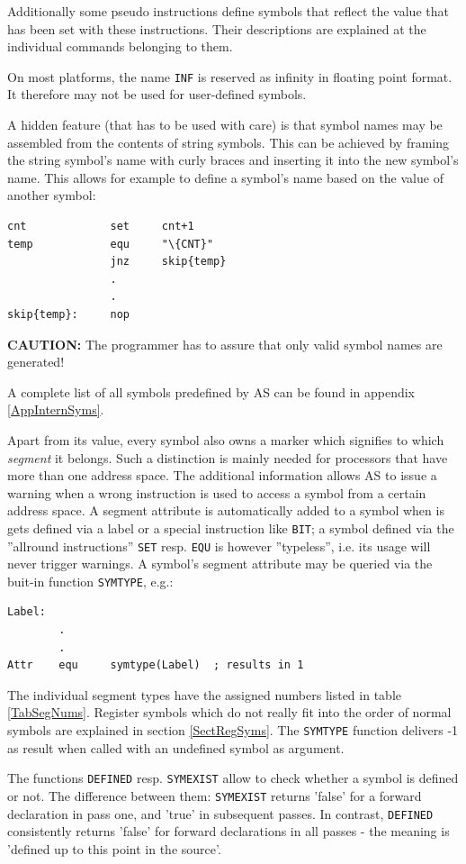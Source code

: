 \documentclass[12pt,twoside]{report}
\newcommand{\bb}[1]{{\bf #1}}
\newcommand{\tty}[1]{{\tt #1}}
\newcommand{\asname}{{AS}}
\begin{document}
Additionally some pseudo instructions define symbols that reflect the
value that has been set  with these instructions.  Their descriptions
are explained at the individual commands belonging to them.

On most platforms, the name {\tt INF} is reserved as infinity in
floating point format.  It therefore may not be used for user-defined
symbols.

A hidden feature (that has to be used with care) is that symbol names
may be assembled from the contents of string symbols.  This can be
achieved by framing the string symbol's name with curly braces and
inserting it into the new symbol's name.  This allows for example to
define a symbol's name based on the value of another symbol:
\begin{verbatim}
cnt             set     cnt+1
temp            equ     "\{CNT}"
                jnz     skip{temp}
                .
                .
skip{temp}:     nop
\end{verbatim}
\bb{CAUTION:} The programmer has to assure that only valid symbol names
are generated!

A complete list of all symbols predefined by \asname{} can be found in
appendix \ref{AppInternSyms}.

Apart from its value, every symbol also owns a marker which signifies to
which {\em segment} it belongs.  Such a distinction is mainly needed for
processors that have more than one address space.  The additional
information allows \asname{} to issue a warning when a wrong instruction is used
to access a symbol from a certain address space.  A segment attribute is
automatically added to a symbol when is gets defined via a label or a
special instruction like \tty{BIT}; a symbol defined via the ''allround
instructions'' \tty{SET} resp. \tty{EQU} is however ''typeless'', i.e. its
usage will never trigger warnings.  A symbol's segment attribute may be
queried via the buit-in function \tty{SYMTYPE}, e.g.:
\begin{verbatim}
Label:
        .
        .
Attr    equ     symtype(Label)  ; results in 1
\end{verbatim}
The individual segment types have the assigned numbers listed in table
\ref{TabSegNums}.  Register symbols which do not really fit into the order
of normal symbols are explained in section \ref{SectRegSyms}.  The
\tty{SYMTYPE} function delivers -1 as result when called with an undefined
symbol as argument.

The functions \tty{DEFINED} resp. \tty{SYMEXIST} allow to check whether a
symbol is defined or not.  The difference between them: \tty{SYMEXIST} returns
'false' for a forward declaration in pass one, and 'true' in subsequent passes.
In contrast, \tty{DEFINED} consistently returns 'false' for forward declarations
in all passes - the meaning is 'defined up to this point in the source'.
\end{document}
